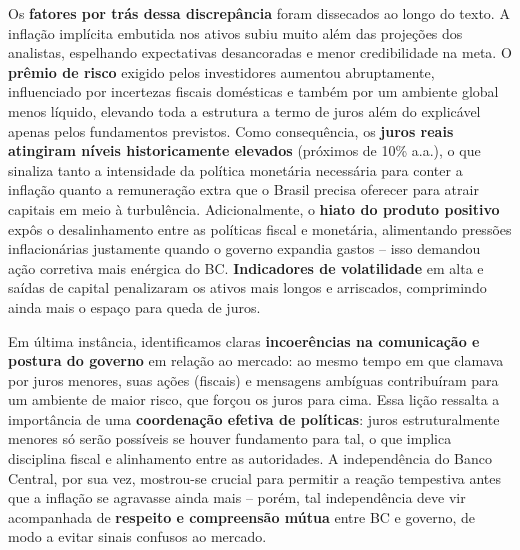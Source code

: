 \documentclass[a4paper,12pt]{article}
\begin{document}
Os \textbf{fatores por trás dessa discrepância} foram dissecados ao longo do texto. A inflação implícita embutida nos ativos subiu muito além das projeções dos analistas, espelhando expectativas desancoradas e menor credibilidade na meta. O \textbf{prêmio de risco} exigido pelos investidores aumentou abruptamente, influenciado por incertezas fiscais domésticas e também por um ambiente global menos líquido, elevando toda a estrutura a termo de juros além do explicável apenas pelos fundamentos previstos. Como consequência, os \textbf{juros reais atingiram níveis historicamente elevados} (próximos de 10\% a.a.), o que sinaliza tanto a intensidade da política monetária necessária para conter a inflação quanto a remuneração extra que o Brasil precisa oferecer para atrair capitais em meio à turbulência. Adicionalmente, o \textbf{hiato do produto positivo} expôs o desalinhamento entre as políticas fiscal e monetária, alimentando pressões inflacionárias justamente quando o governo expandia gastos -- isso demandou ação corretiva mais enérgica do BC. \textbf{Indicadores de volatilidade} em alta e saídas de capital penalizaram os ativos mais longos e arriscados, comprimindo ainda mais o espaço para queda de juros.

Em última instância, identificamos claras \textbf{incoerências na comunicação e postura do governo} em relação ao mercado: ao mesmo tempo em que clamava por juros menores, suas ações (fiscais) e mensagens ambíguas contribuíram para um ambiente de maior risco, que forçou os juros para cima. Essa lição ressalta a importância de uma \textbf{coordenação efetiva de políticas}: juros estruturalmente menores só serão possíveis se houver fundamento para tal, o que implica disciplina fiscal e alinhamento entre as autoridades. A independência do Banco Central, por sua vez, mostrou-se crucial para permitir a reação tempestiva antes que a inflação se agravasse ainda mais -- porém, tal independência deve vir acompanhada de \textbf{respeito e compreensão mútua} entre BC e governo, de modo a evitar sinais confusos ao mercado.
\end{document}
